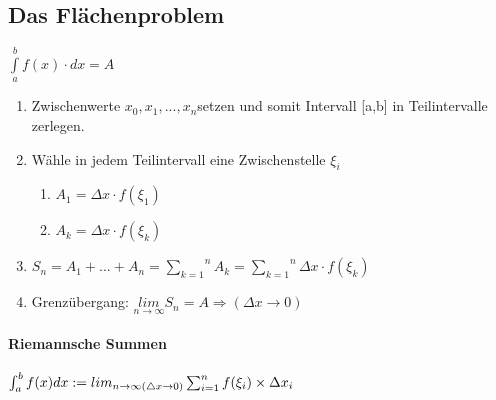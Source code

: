 \subsection*{Das Flächenproblem}

$\underset{a}{\overset{b}{\int}}f(x)\cdot dx=A$
\begin{enumerate}
\item Zwischenwerte $x_{0},x_{1},...,x_{n}$setzen und somit Intervall {[}a,b{]}
in Teilintervalle zerlegen.
\item Wähle in jedem Teilintervall eine Zwischenstelle $\xi_{i}$

\begin{enumerate}
\item $A_{1}=\Delta x\cdot f(\xi_{1})$
\item $A_{k}=\Delta x\cdot f(\xi_{k})$
\end{enumerate}
\item $S_{n}=A_{1}+...+A_{n}=\overset{n}{\underset{k=1}{\sum}}A_{k}=\overset{n}{\underset{k=1}{\sum}}\Delta x\cdot f(\xi_{k})$
\item Grenzübergang: $\underset{n\rightarrow\infty}{lim}S_{n}=A\Rightarrow(\Delta x\rightarrow0)$
\end{enumerate}

\paragraph*{Riemannsche Summen}

$\intop_{a}^{b}f(x)dx:=lim_{n\rightarrow\infty(\triangle x\rightarrow0)}\sum_{i=1}^{n}f(\xi_{i})\times\Delta x_{i}$


